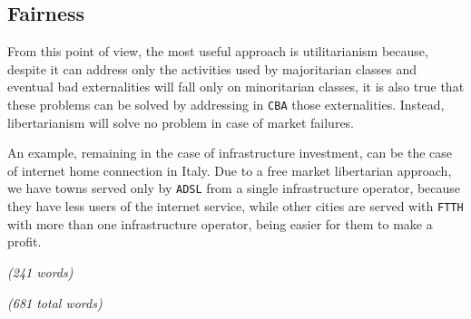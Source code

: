 \subsection{Fairness}
From this point of view, the most useful approach is utilitarianism because, despite it can address only the activities used by majoritarian classes and eventual bad externalities will fall only on minoritarian classes, it is also true that these problems can be solved by addressing in \texttt{CBA} those externalities. Instead, libertarianism will solve no problem in case of market failures. 

An example, remaining in the case of infrastructure investment, can be the case of internet home connection in Italy. Due to a free market libertarian approach, we have towns served only by \texttt{ADSL} from a single infrastructure operator, because they have less users of the internet service, while other cities are served with \texttt{FTTH} with more than one infrastructure operator, being easier for them to make a profit.

\emph{(241 words)}

\emph{(681 total words)}


